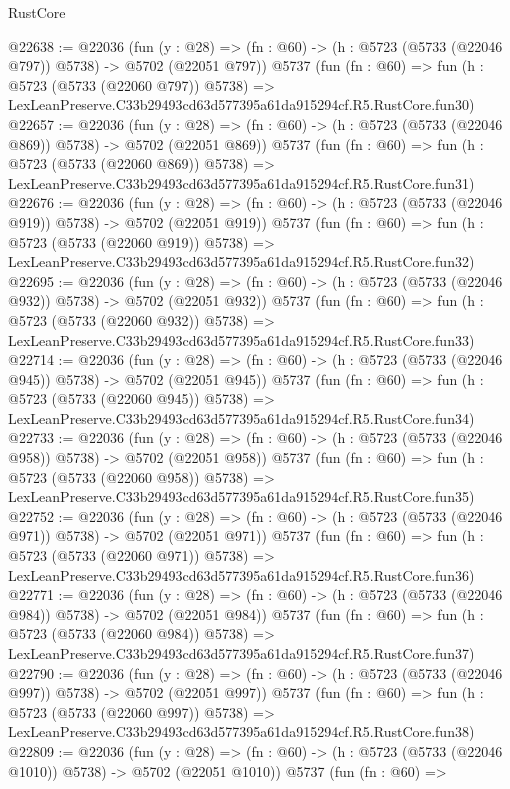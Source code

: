 \begin{lexlean}{RustCore}
\begin{coremodule}
@22638 := @22036
    (fun (y : @28) => (fn : @60) -> (h : @5723 (@5733 (@22046 @797)) @5738) -> @5702 (@22051 @797))
    @5737
    (fun (fn : @60) =>
    fun (h : @5723 (@5733 (@22060 @797)) @5738) =>
    LexLeanPreserve.C33b29493cd63d577395a61da915294cf.R5.RustCore.fun30)
@22657 := @22036
    (fun (y : @28) => (fn : @60) -> (h : @5723 (@5733 (@22046 @869)) @5738) -> @5702 (@22051 @869))
    @5737
    (fun (fn : @60) =>
    fun (h : @5723 (@5733 (@22060 @869)) @5738) =>
    LexLeanPreserve.C33b29493cd63d577395a61da915294cf.R5.RustCore.fun31)
@22676 := @22036
    (fun (y : @28) => (fn : @60) -> (h : @5723 (@5733 (@22046 @919)) @5738) -> @5702 (@22051 @919))
    @5737
    (fun (fn : @60) =>
    fun (h : @5723 (@5733 (@22060 @919)) @5738) =>
    LexLeanPreserve.C33b29493cd63d577395a61da915294cf.R5.RustCore.fun32)
@22695 := @22036
    (fun (y : @28) => (fn : @60) -> (h : @5723 (@5733 (@22046 @932)) @5738) -> @5702 (@22051 @932))
    @5737
    (fun (fn : @60) =>
    fun (h : @5723 (@5733 (@22060 @932)) @5738) =>
    LexLeanPreserve.C33b29493cd63d577395a61da915294cf.R5.RustCore.fun33)
@22714 := @22036
    (fun (y : @28) => (fn : @60) -> (h : @5723 (@5733 (@22046 @945)) @5738) -> @5702 (@22051 @945))
    @5737
    (fun (fn : @60) =>
    fun (h : @5723 (@5733 (@22060 @945)) @5738) =>
    LexLeanPreserve.C33b29493cd63d577395a61da915294cf.R5.RustCore.fun34)
@22733 := @22036
    (fun (y : @28) => (fn : @60) -> (h : @5723 (@5733 (@22046 @958)) @5738) -> @5702 (@22051 @958))
    @5737
    (fun (fn : @60) =>
    fun (h : @5723 (@5733 (@22060 @958)) @5738) =>
    LexLeanPreserve.C33b29493cd63d577395a61da915294cf.R5.RustCore.fun35)
@22752 := @22036
    (fun (y : @28) => (fn : @60) -> (h : @5723 (@5733 (@22046 @971)) @5738) -> @5702 (@22051 @971))
    @5737
    (fun (fn : @60) =>
    fun (h : @5723 (@5733 (@22060 @971)) @5738) =>
    LexLeanPreserve.C33b29493cd63d577395a61da915294cf.R5.RustCore.fun36)
@22771 := @22036
    (fun (y : @28) => (fn : @60) -> (h : @5723 (@5733 (@22046 @984)) @5738) -> @5702 (@22051 @984))
    @5737
    (fun (fn : @60) =>
    fun (h : @5723 (@5733 (@22060 @984)) @5738) =>
    LexLeanPreserve.C33b29493cd63d577395a61da915294cf.R5.RustCore.fun37)
@22790 := @22036
    (fun (y : @28) => (fn : @60) -> (h : @5723 (@5733 (@22046 @997)) @5738) -> @5702 (@22051 @997))
    @5737
    (fun (fn : @60) =>
    fun (h : @5723 (@5733 (@22060 @997)) @5738) =>
    LexLeanPreserve.C33b29493cd63d577395a61da915294cf.R5.RustCore.fun38)
@22809 := @22036
    (fun (y : @28) =>
    (fn : @60) -> (h : @5723 (@5733 (@22046 @1010)) @5738) -> @5702 (@22051 @1010))
    @5737
    (fun (fn : @60) =>

\end{coremodule}
\end{lexlean}
